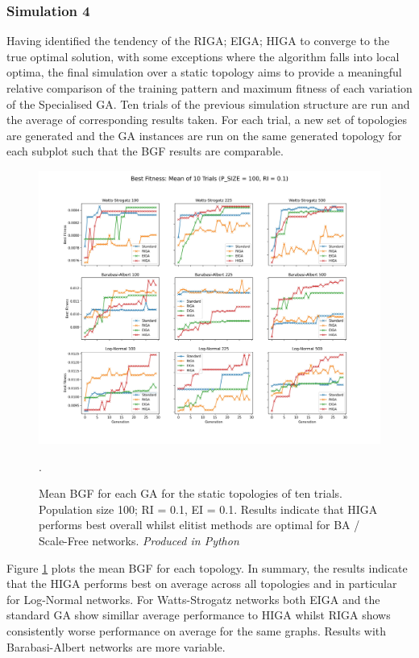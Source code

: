 \documentclass[
	a4paper, %
	10pt, %
	unnumberedsections, %
	twoside, %
]{LTJournalArticle}
\begin{document}
\subsubsection{Simulation 4} Having identified the tendency of the RIGA; EIGA; HIGA to converge to the true optimal solution, with some exceptions where the algorithm falls into local optima, the final simulation over a static topology aims to provide a meaningful relative comparison of the training pattern and maximum fitness of each variation of the Specialised GA. Ten trials of the previous simulation structure are run and the average of corresponding results taken. For each trial, a new set of topologies are generated and the GA instances are run on the same generated topology for each subplot such that the BGF results are comparable.\\

\begin{figure}
	\includegraphics[width=\linewidth]{Figures/sims/static/experiment_4.jpg}
	\caption{Mean BGF for each GA for the static topologies of ten trials. Population size 100; RI = 0.1, EI = 0.1. Results indicate that HIGA performs best overall whilst elitist methods are optimal for BA / Scale-Free networks. \emph{Produced in Python}}. 
	\label{fig:static_4}
\end{figure}

Figure \ref{fig:static_4} plots the mean BGF for each topology. In summary, the results indicate that the HIGA performs best on average across all topologies and in particular for Log-Normal networks. For Watts-Strogatz networks both EIGA and the standard GA show simillar average performance to HIGA whilst RIGA shows consistently worse performance on average for the same graphs. Results with Barabasi-Albert networks are more variable. \\
\end{document}
